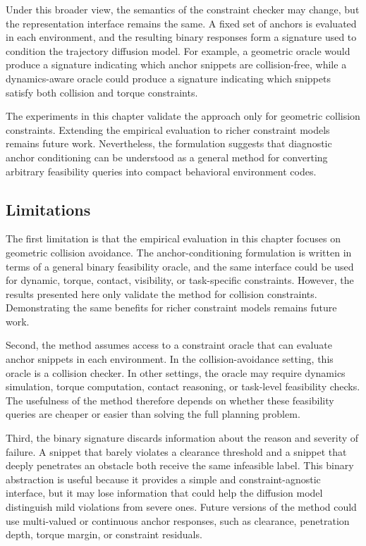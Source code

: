 Under this broader view, the semantics of the constraint checker may change, but the representation interface remains the same. A fixed set of anchors is evaluated in each environment, and the resulting binary responses form a signature used to condition the trajectory diffusion model. For example, a geometric oracle would produce a signature indicating which anchor snippets are collision-free, while a dynamics-aware oracle could produce a signature indicating which snippets satisfy both collision and torque constraints.

The experiments in this chapter validate the approach only for geometric collision constraints. Extending the empirical evaluation to richer constraint models remains future work. Nevertheless, the formulation suggests that diagnostic anchor conditioning can be understood as a general method for converting arbitrary feasibility queries into compact behavioral environment codes.


\subsection{Limitations}

The first limitation is that the empirical evaluation in this chapter focuses on geometric collision avoidance. The anchor-conditioning formulation is written in terms of a general binary feasibility oracle, and the same interface could be used for dynamic, torque, contact, visibility, or task-specific constraints. However, the results presented here only validate the method for collision constraints. Demonstrating the same benefits for richer constraint models remains future work.

Second, the method assumes access to a constraint oracle that can evaluate anchor snippets in each environment. In the collision-avoidance setting, this oracle is a collision checker. In other settings, the oracle may require dynamics simulation, torque computation, contact reasoning, or task-level feasibility checks. The usefulness of the method therefore depends on whether these feasibility queries are cheaper or easier than solving the full planning problem.

Third, the binary signature discards information about the reason and severity of failure. A snippet that barely violates a clearance threshold and a snippet that deeply penetrates an obstacle both receive the same infeasible label. This binary abstraction is useful because it provides a simple and constraint-agnostic interface, but it may lose information that could help the diffusion model distinguish mild violations from severe ones. Future versions of the method could use multi-valued or continuous anchor responses, such as clearance, penetration depth, torque margin, or constraint residuals.

